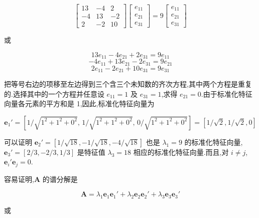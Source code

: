 \[
\begin{bmatrix} 13 & -4 & 2 \\ -4 & 13 & -2 \\ 2 & -2 & 10 \end{bmatrix}\begin{bmatrix} e_{11} \\ e_{21} \\ e_{31} \end{bmatrix} = 9\begin{bmatrix} e_{11} \\ e_{21} \\ e_{31} \end{bmatrix}
\]

或

\[
13e_{11} - 4e_{21} + 2e_{31} = 9e_{11}
\]
\[
-4e_{11} + 13e_{21} - 2e_{31} = 9e_{21}
\]
\[
2e_{11} - 2e_{21} + 10e_{31} = 9e_{31}
\]

把等号右边的项移至左边得到三个含三个未知数的齐次方程,其中两个方程是重复的.选择其中的一个方程并任意设 $e_{11} = 1$ 及 $e_{31} = 1$,求得 $e_{21} = 0$.由于标准化特征向量各元素的平方和是 1,因此,标准化特征向量为

\[
\bm{e}_1' = \left[1/\sqrt{1^2 + 1^2 + 0^2},\, 1/\sqrt{1^2 + 1^2 + 0^2},\, 0/\sqrt{1^2 + 1^2 + 0^2}\right] = [1/\sqrt{2}, 1/\sqrt{2}, 0]
\]

可以证明 $\bm{e}_2' = [1/\sqrt{18}, -1/\sqrt{18}, -4/\sqrt{18}]$ 也是 $\lambda_1 = 9$ 的标准化特征向量, $\bm{e}_3' = [2/3, -2/3, 1/3]$ 是特征值 $\lambda_3 = 18$ 相应的标准化特征向量.而且,对 $i \neq j$, $\bm{e}_i'\bm{e}_j = 0$.

容易证明,$\bm{A}$ 的谱分解是

\[
\bm{A} = \lambda_1\bm{e}_1\bm{e}_1' + \lambda_2\bm{e}_2\bm{e}_2' + \lambda_3\bm{e}_3\bm{e}_3'
\]

或

